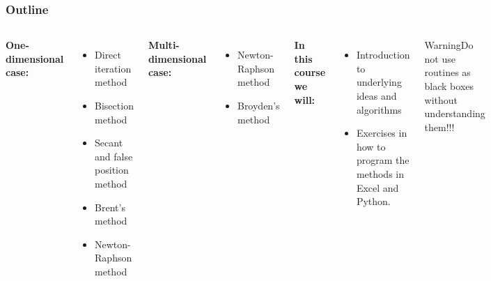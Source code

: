   \begin{frame}[fragile]
    \frametitle{Outline}

      \begin{columns}   
        \textbf{One-dimensional case:}
        \begin{itemize}
          \item Direct iteration method
          \item Bisection method
          \item Secant and false position method
          \item Brent’s method
          \item Newton-Raphson method
        \end{itemize}
        \vspace{0.15cm}
        \textbf{Multi-dimensional case:}
        \begin{itemize}
          \item Newton-Raphson method
          \item Broyden’s method
        \end{itemize}
        \vspace{0.15cm}
        \textbf{In this course we will:}
        \begin{itemize}
          \item Introduction to underlying ideas and algorithms
          \item Exercises in how to program the methods in Excel and Python.
        \end{itemize}
      \begin{block}{Warning}Do not use routines as black boxes without understanding them!!!\end{block}
      \end{columns}
  \end{frame}
  

